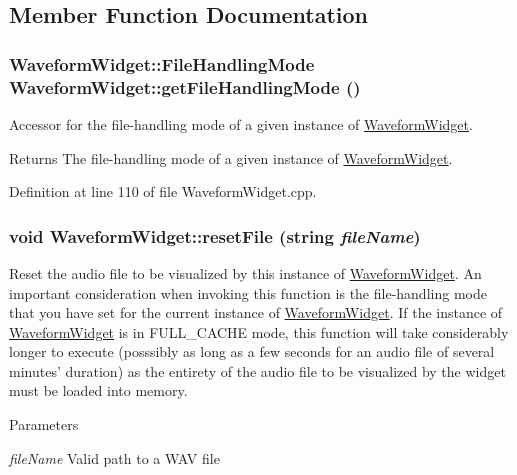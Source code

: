 \subsection{Member Function Documentation}
\hypertarget{classWaveformWidget_aae9f34038d4b391477141df24996b616}{
\subsubsection[{getFileHandlingMode}]{\setlength{\rightskip}{0pt plus 5cm}WaveformWidget::FileHandlingMode WaveformWidget::getFileHandlingMode ()}}
\label{classWaveformWidget_aae9f34038d4b391477141df24996b616}


Accessor for the file-\/handling mode of a given instance of \hyperlink{classWaveformWidget}{WaveformWidget}. \begin{DoxyReturn}{Returns}
The file-\/handling mode of a given instance of \hyperlink{classWaveformWidget}{WaveformWidget}. 
\end{DoxyReturn}


Definition at line 110 of file WaveformWidget.cpp.\hypertarget{classWaveformWidget_aaa9badf231a5d856b453f4d6da87d9b1}{
\subsubsection[{resetFile}]{\setlength{\rightskip}{0pt plus 5cm}void WaveformWidget::resetFile (string {\em fileName})}}
\label{classWaveformWidget_aaa9badf231a5d856b453f4d6da87d9b1}


Reset the audio file to be visualized by this instance of \hyperlink{classWaveformWidget}{WaveformWidget}. An important consideration when invoking this function is the file-\/handling mode that you have set for the current instance of \hyperlink{classWaveformWidget}{WaveformWidget}. If the instance of \hyperlink{classWaveformWidget}{WaveformWidget} is in FULL\_\-CACHE mode, this function will take considerably longer to execute (posssibly as long as a few seconds for an audio file of several minutes' duration) as the entirety of the audio file to be visualized by the widget must be loaded into memory. 
\begin{DoxyParams}{Parameters}
\item[{\em fileName}]Valid path to a WAV file \end{DoxyParams}



